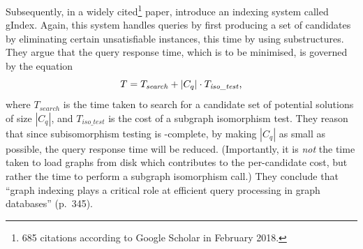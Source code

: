 \documentclass[twoside,11pt]{article}
\begin{document}
Subsequently, in a widely cited\footnote{685 citations according to Google Scholar in February
2018.} paper,  introduce an indexing system
called gIndex. Again, this system handles queries by first producing a set of candidates by
eliminating certain unsatisfiable instances, this time by using substructures. They argue that the
query response time, which is to be minimised, is governed by the equation \[ T =
T_{\mathit{search}} + \left|C_q\right| \cdot T_{\mathit{iso\_test}} \textnormal{,}\] where
$T_{\mathit{search}}$ is the time taken to search for a candidate set of potential solutions of size
$\left|C_q\right|$, and $T_{\mathit{iso\_test}}$ is the cost of a subgraph isomorphism test. They
reason that since subisomorphism testing is \NP-complete, by making $\left|C_q\right|$ as small as
possible, the query response time will be reduced.  (Importantly, it is \emph{not} the time taken to
load graphs from disk which contributes to the per-candidate cost, but rather the time to perform a
subgraph isomorphism call.) They conclude that ``graph indexing plays a critical role at efficient
query processing in graph databases'' (p.\ 345).
\end{document}

